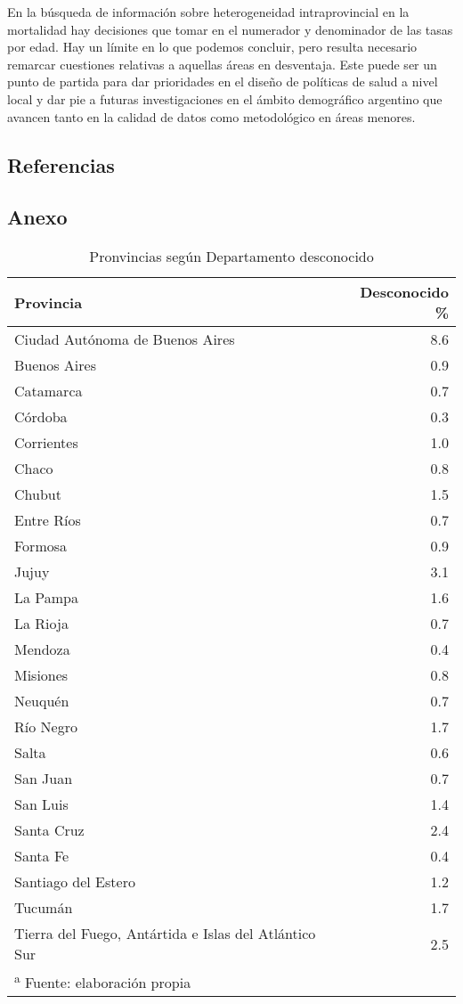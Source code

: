 \documentclass[12pt,]{article}
\begin{document}
En la búsqueda de información sobre heterogeneidad intraprovincial en la
mortalidad hay decisiones que tomar en el numerador y denominador de las
tasas por edad. Hay un límite en lo que podemos concluir, pero resulta
necesario remarcar cuestiones relativas a aquellas áreas en desventaja.
Este puede ser un punto de partida para dar prioridades en el diseño de
políticas de salud a nivel local y dar pie a futuras investigaciones en
el ámbito demográfico argentino que avancen tanto en la calidad de datos
como metodológico en áreas menores.

\hypertarget{referencias}{%
\subsection{Referencias}\label{referencias}}

\hypertarget{anexo}{%
\subsection{Anexo}\label{anexo}}

\begin{table}

\caption{\label{tab:SinDEP}Pronvincias según Departamento desconocido}
\centering
\begin{tabular}[t]{l|r}
\hline
Provincia & Desconocido \%\\
\hline
Ciudad Autónoma de Buenos Aires & 8.6\\
\hline
Buenos Aires & 0.9\\
\hline
Catamarca & 0.7\\
\hline
Córdoba & 0.3\\
\hline
Corrientes & 1.0\\
\hline
Chaco & 0.8\\
\hline
Chubut & 1.5\\
\hline
Entre Ríos & 0.7\\
\hline
Formosa & 0.9\\
\hline
Jujuy & 3.1\\
\hline
La Pampa & 1.6\\
\hline
La Rioja & 0.7\\
\hline
Mendoza & 0.4\\
\hline
Misiones & 0.8\\
\hline
Neuquén & 0.7\\
\hline
Río Negro & 1.7\\
\hline
Salta & 0.6\\
\hline
San Juan & 0.7\\
\hline
San Luis & 1.4\\
\hline
Santa Cruz & 2.4\\
\hline
Santa Fe & 0.4\\
\hline
Santiago del Estero & 1.2\\
\hline
Tucumán & 1.7\\
\hline
Tierra del Fuego, Antártida e Islas del Atlántico Sur & 2.5\\
\hline
\multicolumn{2}{l}{\textsuperscript{a} Fuente: elaboración propia}\\
\end{tabular}
\end{table}
\end{document}
